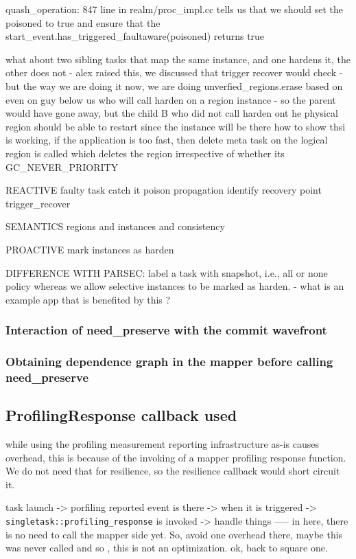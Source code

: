 quash\_operation:
  847 line in realm/proc\_impl.cc tells us that we should set the poisoned to true and ensure that the start\_event.has\_triggered\_faultaware(poisoned) returns true

what about two sibling tasks that map the same instance, and one hardens it, the other does not
    - alex raised this, we discussed that trigger recover would check 
    - but the way we are doing it now, we are doing unverfied\_regions.erase based on even on guy below us who will call harden on a region instance
    - so the parent would have gone away, but the child B who did not call harden ont he physical region should be able to restart since the instance will be there
how to show thsi is working, if the application is too fast, then delete meta task on the logical region is called which deletes the region irrespective of whether its GC\_NEVER\_PRIORITY

REACTIVE
faulty task
   catch it
   poison propagation
   identify recovery point
   trigger\_recover

SEMANTICS
regions and instances and consistency

PROACTIVE
    mark instances as harden
    
DIFFERENCE WITH PARSEC:
    label a task with snapshot, i.e., all or none policy
    whereas we allow selective instances to be marked as harden.
      - what is an example app that is benefited by this ?

\subsubsection{Interaction of need\_preserve with the commit wavefront}
\subsubsection{Obtaining dependence graph in the mapper before calling need\_preserve} 


\subsection{ProfilingResponse callback used}
while using the profiling measurement reporting infrastructure as-is causes overhead, this is because of the invoking of a mapper profiling response function. We do not need that for resilience, so the resilience callback would short circuit it.

task launch -> porfiling reported event is there -> when it is triggered -> \texttt{singletask::profiling\_response} is invoked -> handle things
   ----- in here, there is no need to call the mapper side yet. So, avoid one overhead there, maybe this was never called and so , this is not an optimization. ok, back to square one. 

 
